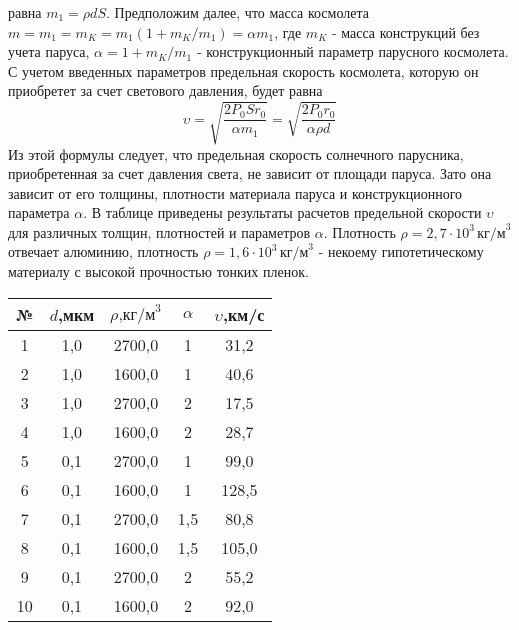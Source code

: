  
\pagestyle{fancy}
\fancyhead{} %
\renewcommand{\headrulewidth}{0pt}
\renewcommand{\footrulewidth}{0pt}
\fancyfoot{}
\setlength{\columnsep}{1cm}
\begin{multicols}{2}

\noindent равна $m_1 = \rho dS$. Предположим далее, что масса космолета $m=m_1=m_K=m_1(1+m_K/m_1)=\alpha m_1$, где $m_K$ - масса конструкций без учета паруса, $\alpha=1+m_K/m_1$ - конструкционный параметр парусного космолета. С учетом введенных параметров предельная скорость космолета, которую он приобретет за счет светового давления, будет равна
\[ \upsilon=\sqrt{\frac{2P_0Sr_0}{\alpha m_1}}=\sqrt{\frac{2P_0r_0}{\alpha\rho d}} \]
Из этой формулы следует, что предельная скорость солнечного парусника, приобретенная за счет давления света, не зависит от площади паруса. Зато она зависит от его толщины, плотности материала паруса и конструкционного параметра $\alpha$. В таблице приведены результаты расчетов предельной скорости $\upsilon$ для различных толщин, плотностей и параметров $\alpha$. Плотность $\rho=2,7 \cdot 10^3\, \text{кг/м}^3$ отвечает алюминию, плотность $\rho=1,6 \cdot 10^3\, \text{кг/м}^3$ - некоему гипотетическому материалу с высокой прочностью тонких пленок.
\bigskip\\
\renewcommand{\arraystretch}{1.3}
\setlength{\tabcolsep}{12pt}
\begin{tabular}{ |c|c|c|c|c| } 
\hline
№ & $d$,мкм & $\rho\text{,кг/м}^3$ & $\alpha$ & $\upsilon$,км/с \\ 
\hline
1 & 1,0 & 2700,0 & 1 & 31,2 \\ 
\hline
2 & 1,0 & 1600,0 & 1 & 40,6 \\ 
\hline
3 & 1,0 & 2700,0 & 2 & 17,5 \\ 
\hline
4 & 1,0 & 1600,0 & 2 & 28,7 \\ 
\hline
5 & 0,1 & 2700,0 & 1 & 99,0 \\ 
\hline
6 & 0,1 & 1600,0 & 1 & 128,5 \\ 
\hline
7 & 0,1 & 2700,0 & 1,5 & 80,8 \\ 
\hline
8 & 0,1 & 1600,0 & 1,5 & 105,0 \\ 
\hline
9 & 0,1 & 2700,0 & 2 & 55,2 \\ 
\hline
10 & 0,1 & 1600,0 & 2 & 92,0 \\ 
\hline
\end{tabular}\\
\bigskip


\end{multicols}
